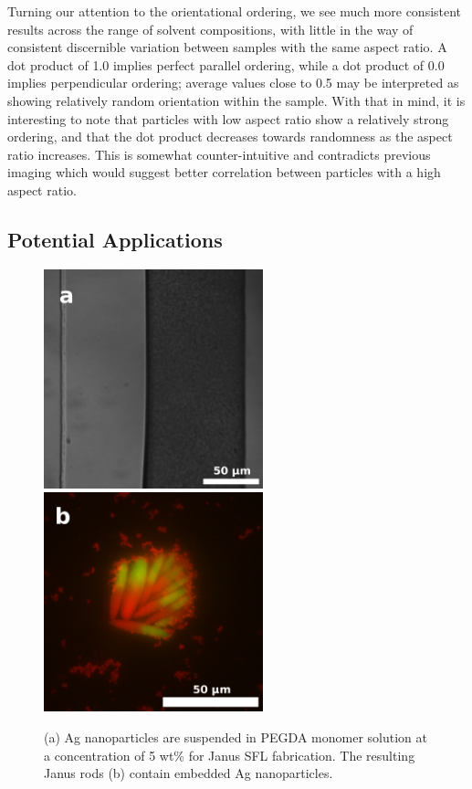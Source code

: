 Turning our attention to the orientational ordering, we see much more consistent results across the
range of solvent compositions, with little in the way of consistent discernible variation between samples with
the same aspect ratio.  A dot product of 1.0 implies perfect parallel ordering, while a dot product of 0.0 implies
perpendicular ordering; average values close to 0.5 may be interpreted as showing relatively random orientation
within the sample.  With that in mind, it is interesting to note that particles with low aspect ratio show 
a relatively strong ordering, and that the dot product decreases towards randomness as the aspect ratio 
increases.  This is somewhat counter-intuitive and contradicts previous imaging which would suggest
better correlation between particles with a high aspect ratio.

\subsection{Potential Applications}

\begin{figure}
\begin{center}

\includegraphics[height=2.5in]{figures/rods/silver-microchannel-twostream.png}
\includegraphics[height=2.5in]{figures/rods/silver-fluorescence-assembly.png}
\end{center}
\caption{
(a) Ag nanoparticles are suspended in PEGDA monomer solution at 
a concentration of 5 wt\% for Janus SFL fabrication.  The resulting
Janus rods (b) contain embedded Ag nanoparticles.} 
\label{fig:silver-janus}
\end{figure}

